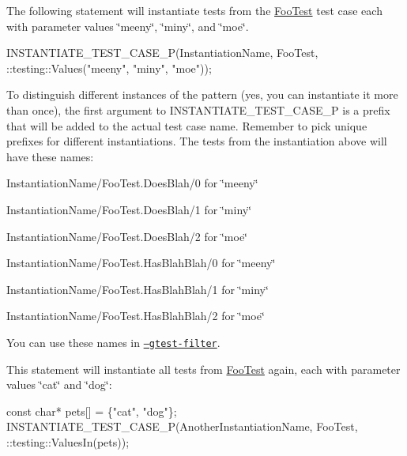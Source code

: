 The following statement will instantiate tests from the {\ttfamily \hyperlink{classFooTest}{Foo\+Test}} test case each with parameter values {\ttfamily \char`\"{}meeny\char`\"{}}, {\ttfamily \char`\"{}miny\char`\"{}}, and {\ttfamily \char`\"{}moe\char`\"{}}.


\begin{DoxyCode}
INSTANTIATE\_TEST\_CASE\_P(InstantiationName,
                        FooTest,
                        ::testing::Values("meeny", "miny", "moe"));
\end{DoxyCode}


To distinguish different instances of the pattern (yes, you can instantiate it more than once), the first argument to {\ttfamily I\+N\+S\+T\+A\+N\+T\+I\+A\+T\+E\+\_\+\+T\+E\+S\+T\+\_\+\+C\+A\+S\+E\+\_\+P} is a prefix that will be added to the actual test case name. Remember to pick unique prefixes for different instantiations. The tests from the instantiation above will have these names\+:


\begin{DoxyItemize}
\item {\ttfamily Instantiation\+Name/\+Foo\+Test.\+Does\+Blah/0} for {\ttfamily \char`\"{}meeny\char`\"{}}
\item {\ttfamily Instantiation\+Name/\+Foo\+Test.\+Does\+Blah/1} for {\ttfamily \char`\"{}miny\char`\"{}}
\item {\ttfamily Instantiation\+Name/\+Foo\+Test.\+Does\+Blah/2} for {\ttfamily \char`\"{}moe\char`\"{}}
\item {\ttfamily Instantiation\+Name/\+Foo\+Test.\+Has\+Blah\+Blah/0} for {\ttfamily \char`\"{}meeny\char`\"{}}
\item {\ttfamily Instantiation\+Name/\+Foo\+Test.\+Has\+Blah\+Blah/1} for {\ttfamily \char`\"{}miny\char`\"{}}
\item {\ttfamily Instantiation\+Name/\+Foo\+Test.\+Has\+Blah\+Blah/2} for {\ttfamily \char`\"{}moe\char`\"{}}
\end{DoxyItemize}

You can use these names in \href{#running-a-subset-of-the-tests}{\tt --gtest-\/filter}.

This statement will instantiate all tests from {\ttfamily \hyperlink{classFooTest}{Foo\+Test}} again, each with parameter values {\ttfamily \char`\"{}cat\char`\"{}} and {\ttfamily \char`\"{}dog\char`\"{}}\+:


\begin{DoxyCode}
const char* pets[] = \{"cat", "dog"\};
INSTANTIATE\_TEST\_CASE\_P(AnotherInstantiationName, FooTest,
                        ::testing::ValuesIn(pets));
\end{DoxyCode}


